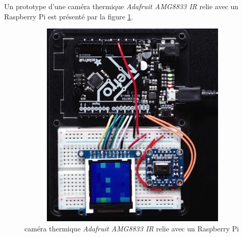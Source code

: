 \documentclass[12pt]{article}
\begin{document}
\begin{itemize}
	
	Un prototype d'une caméra thermique \textit{Adafruit AMG8833 IR} relie avec un Raspberry Pi est présenté par la figure \ref{fig:raspther}.
	\newpage
	\begin{figure}[h]
				\centering
		\includegraphics[height=10cm,width=12cm]{img-Chapiter-3/therPi.png}
		\caption{caméra thermique \textit{Adafruit AMG8833 IR} relie avec un Raspberry Pi }
		\label{fig:raspther}
	\end{figure}
\end{itemize}
\end{document}
